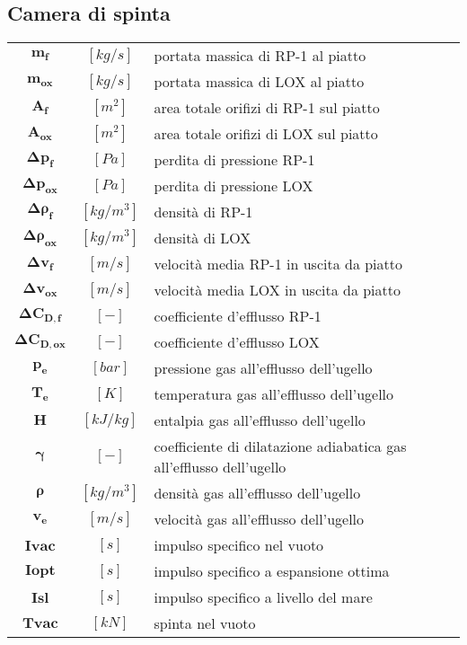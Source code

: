 \begin{multicols}{2}
	\subsection{Camera di spinta}
	\begin{tabularx}{\linewidth}{cc>{\raggedright\arraybackslash}X}
		$\bm{m_f}$ & $[kg/s]$ & portata massica di RP-1 al piatto \\
		$\bm{m_{ox}}$ & $[kg/s]$ & portata massica di LOX al piatto \\
		$\bm{A_f}$ & $[m^2]$ & area totale orifizi di RP-1 sul piatto \\
		$\bm{A_{ox}}$ & $[m^2]$ & area totale orifizi di LOX sul piatto \\
		$\bm{\Delta p_f}$ & $[Pa]$ & perdita di pressione RP-1 \\
		$\bm{\Delta p_{ox}}$ & $[Pa]$ & perdita di pressione LOX \\
		$\bm{\Delta \rho_f}$ & $[kg/m^3]$ & densità di RP-1 \\
		$\bm{\Delta \rho_{ox}}$ & $[kg/m^3]$ & densità di LOX \\
		$\bm{\Delta v_f}$ & $[m/s]$ & velocità media RP-1 in uscita da piatto \\
		$\bm{\Delta v_{ox}}$ & $[m/s]$ & velocità media LOX in uscita da piatto \\
		$\bm{\Delta C_{D,f}}$ & $[-]$ & coefficiente d'efflusso RP-1 \\
		$\bm{\Delta C_{D,ox}}$ & $[-]$ & coefficiente d'efflusso LOX \\
		$\bm{p_e}$ & $[bar]$ & pressione gas all'efflusso dell'ugello \\
		$\bm{T_e}$ & $[K]$ & temperatura gas all'efflusso dell'ugello \\
		$\bm{H}$ & $[kJ/kg]$ & entalpia gas all'efflusso dell'ugello \\
		$\bm{\gamma}$ & $[-]$ & coefficiente di dilatazione adiabatica gas all'efflusso dell'ugello \\
		$\bm{\rho}$ & $[kg/m^3]$ & densità gas all'efflusso dell'ugello \\
		$\bm{v_e}$ & $[m/s]$ & velocità gas all'efflusso dell'ugello \\
		$\bm{I{vac}}$ & $[s]$ & impulso specifico nel vuoto \\
		$\bm{I{opt}}$ & $[s]$ & impulso specifico a espansione ottima \\
		$\bm{I{sl}}$ & $[s]$ & impulso specifico a livello del mare \\
		$\bm{T{vac}}$ & $[kN]$ & spinta nel vuoto \\

\end{tabularx}
\end{multicols}
